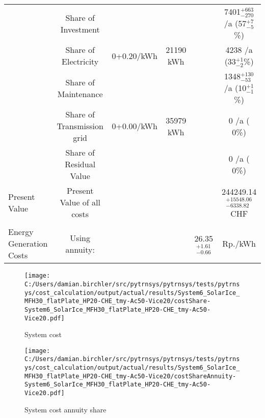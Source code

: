 \documentclass[english]{SPFShortReport}
\begin{document}
\begin{table}[!ht]
\begin{adjustbox}{max width =\textwidth}
\begin{tabular}{l | c c c c c }
 & Share of Investment & &&& 7401$^{\mathrm{+663}}_{\mathrm{-270}}$ /a (57$^{\mathrm{+ 7}}_{\mathrm{- 5}}$\%) \\
 & Share of Electricity & 0+0.20/kWh & 21190 kWh &  & 4238 /a (33$^{\mathrm{+ 1}}_{\mathrm{- 2}}$\%)\\
 & Share of Maintenance & &&& 1348$^{\mathrm{+130}}_{\mathrm{-53}}$ /a (10$^{\mathrm{+ 1}}_{\mathrm{- 1}}$\%)\\ 
 & Share of Transmission grid & 0+0.00/kWh & 35979 kWh & &  0 /a ( 0\%)\\
 & Share of Residual Value &&& &  0 /a ( 0\%)\\
Present Value  & Present Value of all costs  & &&& 244249.14$^{\mathrm{+15548.06}}_{\mathrm{-6338.82}}$ CHF \\
\hline \\ 
 Energy Generation Costs & Using annuity: &&& 26.35$^{\mathrm{+1.61}}_{\mathrm{-0.66}}$ & Rp./kWh \\
\hline
\hline
\end{tabular}
\end{adjustbox}
\label{CostsTable}
\end{table}
\begin{figure}[!htbp]
\begin{center}
\texttt{[image: C:/Users/damian.birchler/src/pytrnsys/pytrnsys/tests/pytrnsys/cost\_calculation/output/actual/results/System6\_SolarIce\_MFH30\_flatPlate\_HP20-CHE\_tmy-Ac50-Vice20/costShare-System6\_SolarIce\_MFH30\_flatPlate\_HP20-CHE\_tmy-Ac50-Vice20.pdf]}
\caption{System cost}
\label{systemCost}
\end{center}
\end{figure}
\begin{figure}[!htbp]
\begin{center}
\texttt{[image: C:/Users/damian.birchler/src/pytrnsys/pytrnsys/tests/pytrnsys/cost\_calculation/output/actual/results/System6\_SolarIce\_MFH30\_flatPlate\_HP20-CHE\_tmy-Ac50-Vice20/costShareAnnuity-System6\_SolarIce\_MFH30\_flatPlate\_HP20-CHE\_tmy-Ac50-Vice20.pdf]}
\caption{System cost annuity share}
\label{systemCostannuity}
\end{center}
\end{figure}
\end{document}
